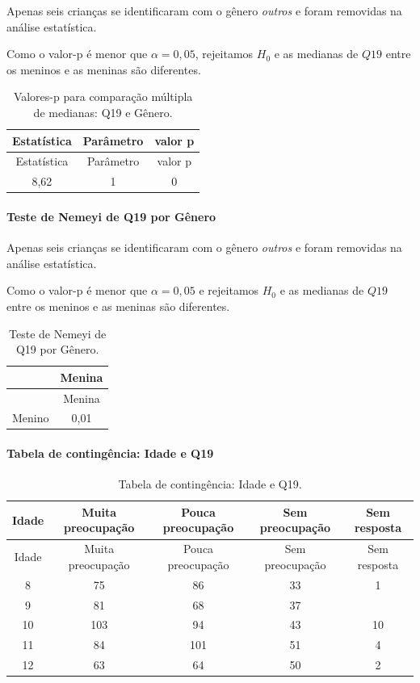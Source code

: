 \documentclass[]{article}
\let\oldparagraph\paragraph
\renewcommand{\paragraph}[1]{\oldparagraph{#1}\mbox{}}
\begin{document}
Apenas seis crianças se identificaram com o gênero \emph{outros} e foram removidas na análise estatística.

Como o valor-p é menor que \(\alpha=0,05\), rejeitamos \(H_0\) e as medianas de \(Q19\) entre os meninos e as meninas são diferentes.

\begin{longtable}[]{@{}ccc@{}}
\caption{\label{tab:unnamed-chunk-262}Valores-p para comparação múltipla de medianas: Q19 e Gênero.}\tabularnewline
\toprule
Estatística & Parâmetro & valor p\tabularnewline
\midrule
\endfirsthead
\toprule
Estatística & Parâmetro & valor p\tabularnewline
\midrule
\endhead
8,62 & 1 & 0\tabularnewline
\bottomrule
\end{longtable}

\hypertarget{teste-de-nemeyi-de-q19-por-guxeanero}{%
\paragraph{Teste de Nemeyi de Q19 por Gênero}\label{teste-de-nemeyi-de-q19-por-guxeanero}}

Apenas seis crianças se identificaram com o gênero \emph{outros} e foram removidas na análise estatística.

Como o valor-p é menor que \(\alpha=0,05\) e rejeitamos \(H_0\) e as medianas de \(Q19\) entre os meninos e as meninas são diferentes.

\begin{longtable}[]{@{}lc@{}}
\caption{\label{tab:unnamed-chunk-263}Teste de Nemeyi de Q19 por Gênero.}\tabularnewline
\toprule
& Menina\tabularnewline
\midrule
\endfirsthead
\toprule
& Menina\tabularnewline
\midrule
\endhead
Menino & 0,01\tabularnewline
\bottomrule
\end{longtable}

\cleardoublepage

\hypertarget{tabela-de-continguxeancia-idade-e-q19}{%
\paragraph{Tabela de contingência: Idade e Q19}\label{tabela-de-continguxeancia-idade-e-q19}}

\begin{longtable}[]{@{}ccccc@{}}
\caption{\label{tab:unnamed-chunk-264}Tabela de contingência: Idade e Q19.}\tabularnewline
\toprule
Idade & Muita preocupação & Pouca preocupação & Sem preocupação & Sem resposta\tabularnewline
\midrule
\endfirsthead
\toprule
Idade & Muita preocupação & Pouca preocupação & Sem preocupação & Sem resposta\tabularnewline
\midrule
\endhead
8 & 75 & 86 & 33 & 1\tabularnewline
9 & 81 & 68 & 37 &\tabularnewline
10 & 103 & 94 & 43 & 10\tabularnewline
11 & 84 & 101 & 51 & 4\tabularnewline
12 & 63 & 64 & 50 & 2\tabularnewline
\bottomrule
\end{longtable}
\end{document}
